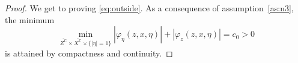 \documentclass[
	fontsize=11pt, 
	twoside=false, 
	abstract=true, 
	a4paper,
]{scrartcl}
\newcommand{\eps}{\varepsilon}
\newcommand{\CC}{\mathbb{C}}
\newcommand{\abs}[1]{\left\lvert#1\right\rvert}
\newcommand{\del}{\partial}
\newcommand{\an}{\quad\text{and}\quad}
\begin{document}
\begin{proof}
We get to proving \cref{eq:outside}. 
	As a consequence of assumption~\ref{as:n3}, the minimum 
	\[
		\min_{\overline{Z^\CC}\times \overline{X^\CC}\times\{\abs{\eta} = 1\}} \abs{\varphi_\eta(z, x,\eta)} + \abs{\varphi_z(z, x,\eta)} = c_0 > 0
	\]
	is attained by compactness and continuity. 

\end{proof}
\end{document}
